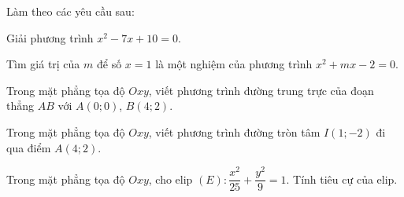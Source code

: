 
\NQuestion Làm theo các yêu cầu sau: 
\begin{SubQuestions}
\item Giải phương trình $x^2-7x+10=0$.
\item Tìm giá trị của $m$ để số $x=1$ là một nghiệm của phương trình $x^2+mx-2=0$.
\end{SubQuestions}

\NQuestion Trong mặt phẳng tọa độ $Oxy$, viết phương trình đường trung trực của đoạn thẳng $AB$ với $A(0;0)$, $B(4;2)$.

\NQuestion Trong mặt phẳng tọa độ $Oxy$, viết phương trình đường tròn tâm $I(1;-2)$ đi qua điểm $A(4;2)$.

\NQuestion Trong mặt phẳng tọa độ $Oxy$, cho elip $(E):\dfrac{x^2}{25}+\dfrac{y^2}{9}=1$. Tính tiêu cự của elip.
